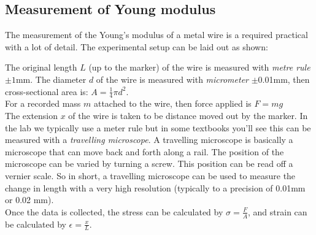 \documentclass[a4paper,12pt]{book}
\begin{document}
\newpage
\subsection{Measurement of Young modulus}\label{ch-measure-E}

The measurement of the Young's modulus of a metal wire is a required practical with a lot of detail. The experimental setup can be laid out as shown:

\begin{figure}[ht]
	\centering
\end{figure}

The original length $L$ (up to the marker) of the wire is measured with \emph{metre rule} $\pm 1$mm. The diameter $d$ of the wire is measured with \emph{micrometer} $\pm$0.01mm, then cross-sectional area is: $A = \frac{1}{4}\pi d^2$.\\

For a recorded mass $m$ attached to the wire, then force applied is $F=mg$\\

The extension $x$ of the wire is taken to be distance moved out by the marker. In the lab we typically use a meter rule but in some textbooks you'll see this can be measured with a \emph{travelling microscope}. A travelling microscope is basically a microscope that can move back and forth along a rail. The position of the microscope can be varied by turning a screw. This position can be read off a vernier scale. So in short, a travelling microscope can be used to measure the change in length with a very high resolution (typically to a precision of 0.01mm or 0.02 mm).\\
Once the data is collected, the stress can be calculated by $\sigma = \frac{F}{A}$, and strain can be calculated by $\epsilon = \frac{x}{L}$.\\
\end{document}
